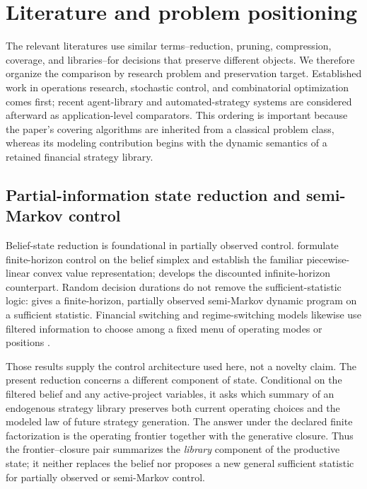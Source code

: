 \section{Literature and problem positioning}
\label{sec:literature}
\label{sec:literature-boundary}

The relevant literatures use similar terms--reduction, pruning, compression,
coverage, and libraries--for decisions that preserve different objects. We
therefore organize the comparison by research problem and preservation target.
Established work in operations research, stochastic control, and combinatorial
optimization comes first; recent agent-library and automated-strategy systems
are considered afterward as application-level comparators. This ordering is
important because the paper's covering algorithms are inherited from a
classical problem class, whereas its modeling contribution begins with the
dynamic semantics of a retained financial strategy library.

\subsection{Partial-information state reduction and semi-Markov control}

Belief-state reduction is foundational in partially observed control.
\citet{SmallwoodSondik1973} formulate finite-horizon control on the belief
simplex and establish the familiar piecewise-linear convex value
representation; \citet{Sondik1978} develops the discounted infinite-horizon
counterpart. Random decision durations do not remove the sufficient-statistic
logic: \citet{White1976} gives a finite-horizon, partially observed semi-Markov
dynamic program on a sufficient statistic. Financial switching and
regime-switching models likewise use filtered information to choose among a
fixed menu of operating modes or positions
\citep{Lakner1998,LiNystromOlofsson2015,DaiZhangZhu2010}.

Those results supply the control architecture used here, not a novelty claim.
The present reduction concerns a different component of state. Conditional on
the filtered belief and any active-project variables, it asks which summary of
an endogenous strategy library preserves both current operating choices and
the modeled law of future strategy generation. The answer under the declared
finite factorization is the operating frontier together with the generative
closure. Thus the frontier--closure pair summarizes the \emph{library}
component of the productive state; it neither replaces the belief nor proposes
a new general sufficient statistic for partially observed or semi-Markov
control.

